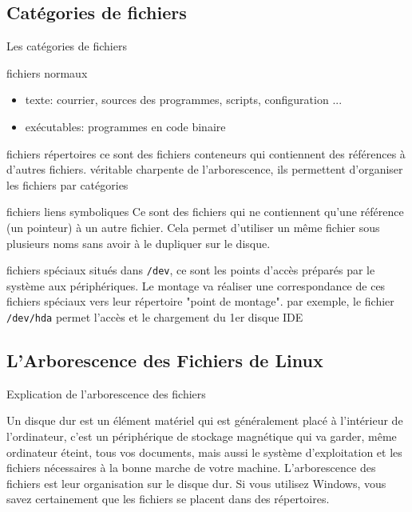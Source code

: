 \documentclass[10pt]{beamer}
\begin{document}
\subsection{Catégories de fichiers}
\begin{frame}{Les catégories de fichiers}
\begin{alertblock}{fichiers normaux}
\begin{itemize}
\item texte: courrier, sources des programmes, scripts, configuration ...
\item exécutables: programmes en code binaire
\end{itemize}
\end{alertblock}

\begin{alertblock}{fichiers répertoires}
ce sont des fichiers conteneurs qui contiennent des références à d'autres fichiers.
véritable charpente de l'arborescence, ils permettent d'organiser les fichiers par
catégories
\end{alertblock}

\begin{alertblock}{fichiers liens symboliques}
Ce sont des fichiers qui ne contiennent qu'une référence (un pointeur) à un autre fichier.
Cela   permet   d'utiliser   un   même   fichier   sous   plusieurs   noms   sans   avoir   à   le
dupliquer sur le disque.
\end{alertblock}
\end{frame}

\begin{frame}
\begin{alertblock}{fichiers spéciaux}
situés dans \texttt{/dev}, ce sont les points d'accès préparés par le système aux
périphériques. Le montage va réaliser une correspondance de ces fichiers spéciaux
vers leur répertoire "point de montage".
par exemple, le fichier \texttt{/dev/hda} permet l'accès et le chargement du 1er disque IDE
\end{alertblock}
\end{frame}

\subsection{L'Arborescence des Fichiers de Linux}
\begin{frame}{Explication de l'arborescence des fichiers}

Un disque dur est un élément matériel qui est généralement placé à l’intérieur de
l’ordinateur, c’est un périphérique de stockage magnétique qui va garder, même
ordinateur éteint, tous vos documents, mais aussi le système d’exploitation et les
fichiers nécessaires  à la bonne   marche  de  votre  machine.  L’arborescence  des
fichiers est leur organisation sur le disque dur. Si vous utilisez Windows, vous savez
certainement que les fichiers se placent dans des répertoires.
\end{frame}
\end{document}
